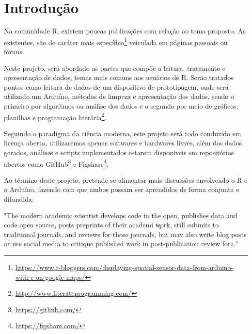 \section*{Introdução}

Na comunidade R, existem poucas publicações com relação ao tema proposto. As existentes, são de caráter mais específico\footnote{\url{https://www.r-bloggers.com/displaying-spatial-sensor-data-from-arduino-with-r-on-google-maps/}} veiculada em páginas pessoais ou fóruns.

Neste projeto, será abordado as partes que compõe a leitura, tratamento e apresentação de dados, temas mais comuns aos usuários de R. Serão tratados pontos como leitura de dados de um dispositivo de prototipagem, onde será utilizado um Arduíno, métodos de limpeza e apresentação dos dados, sendo o primeiro por algoritmos ou análise dos dados e o segundo por meio de gráficos, planilhas e programação literária\footnote{\url{http://www.literateprogramming.com/}}.

Seguindo o paradigma da ciência moderna, este projeto será todo conduzido em licença aberta, utilizaremos apenas softwares e hardwares livres, além dos dados gerados, análises e scripts implementados estarem disponíveis em repositórios abertos como GitHub\footnote{\url{https://github.com/}} e Figshare\footnote{\url{https://figshare.com/}}.

Ao término deste projeto, pretende-se alimentar mais discussões envolvendo o R e o Arduíno, fazendo com que ambos possam ser aprendidos de forma conjunta e difundida. 

\begin{citacao}[english]
  "The modern academic scientist develops code in the open, publishes data and code open source, posts preprints of their academi \c work, still submits to traditional journals, and reviews for those journals, but may also write blog posts or use social media to critique published work in post-publication review fora."\cite{Peng2015}
\end{citacao}

    